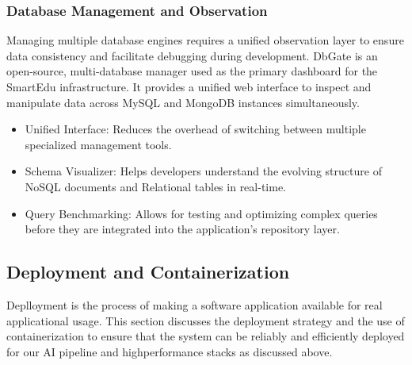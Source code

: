 \subsubsection*{Database Management and Observation}
Managing multiple database engines requires a unified observation layer to ensure data consistency and facilitate debugging during development.
DbGate is an open-source, multi-database manager used as the primary dashboard for the SmartEdu infrastructure. It provides a unified web interface to inspect and manipulate data across MySQL and MongoDB instances simultaneously.
\begin{itemize}
    \item Unified Interface: Reduces the overhead of switching between multiple specialized management tools.
    \item Schema Visualizer: Helps developers understand the evolving structure of NoSQL documents and Relational tables in real-time.
    \item Query Benchmarking: Allows for testing and optimizing complex queries before they are integrated into the application's repository layer.
\end{itemize}

\subsection{Deployment and Containerization}
Deplloyment is the process of making a software application available for real applicational usage. This section discusses the deployment strategy and the use of containerization to ensure that the system can be reliably and efficiently deployed for our AI pipeline and high\-performance stacks as discussed above.

